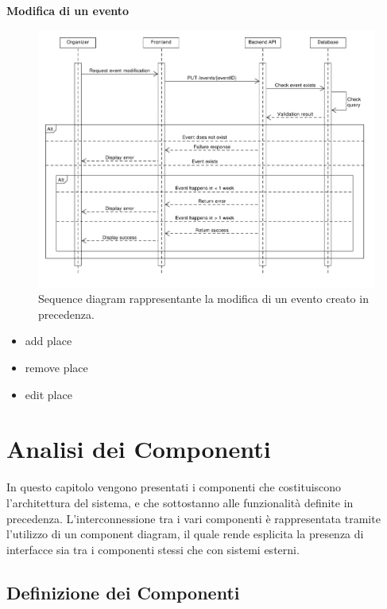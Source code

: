 \documentclass[9pt]{extarticle}
\begin{document}
\newpage
\textbf{Modifica di un evento}
\begin{figure}[!htb]
	\centering
	\includegraphics[width=\linewidth]{./images/SequenceDiagramEventModification.pdf}
	\caption{Sequence diagram rappresentante la modifica di un evento creato in precedenza.}
	\label{fig:SeqDiagEventModification}
\end{figure}

\newpage

\begin{itemize}
	\item add place
	\item remove place
	\item edit place
\end{itemize}

\newpage
\section{Analisi dei Componenti}

In questo capitolo vengono presentati i componenti che costituiscono l'architettura del sistema, e che sottostanno alle funzionalità definite in precedenza. L'interconnessione tra i vari componenti è rappresentata tramite l'utilizzo di un component diagram, il quale rende esplicita la presenza di interfacce sia tra i componenti  stessi che con sistemi esterni.


\subsection{Definizione dei Componenti}
\end{document}
